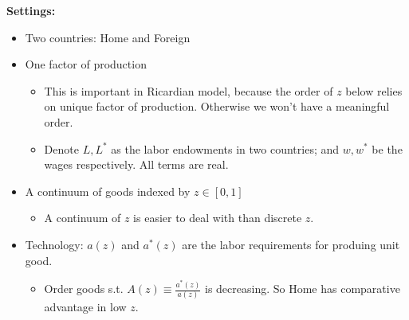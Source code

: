\documentclass{book}
\theoremstyle{plain}
\theoremstyle{definition}
\newcommand{\mytitle}[1]{{\large{\textbf{#1}}}}
\begin{document}
\mytitle{Settings:}
\begin{itemize}
	\item Two countries: Home and Foreign
	\item One factor of production
	\begin{itemize}
		\item This is important in Ricardian model, because the order of $z$ below relies on unique factor of production. Otherwise we won't have a meaningful order.
		\item Denote $L, L^*$ as the labor endowments in two countries; and $w, w^*$ be the wages respectively. All terms are real.
	\end{itemize}
	\item A continuum of goods indexed by $z \in [0,1]$
	\begin{itemize}
		\item A continuum of $z$ is easier to deal with than discrete $z$.
	\end{itemize}
	\item Technology: $a(z)$ and $a^*(z)$ are the labor requirements for produing unit good.
	\begin{itemize}
		\item Order goods s.t. $A(z)\equiv \frac{a^*(z)}{a(z)}$ is decreasing. So Home has comparative advantage in low $z$.
	\end{itemize}
\end{itemize}
\end{document}
